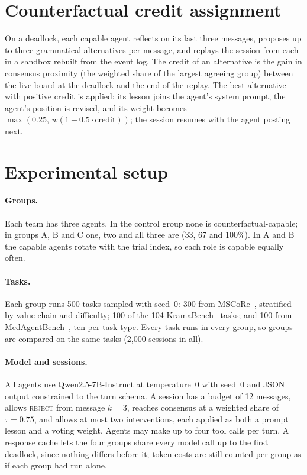 \documentclass[11pt]{article}
\begin{document}
\section{Counterfactual credit assignment}
\label{sec:cf}
On a deadlock, each capable agent reflects on its last three messages, proposes up to three
grammatical alternatives per message, and replays the session from each in a sandbox rebuilt from
the event log. The credit of an alternative is the gain in consensus proximity (the weighted
share of the largest agreeing group) between the live board at the deadlock and the end of the
replay. The best alternative with positive credit is applied: its lesson joins the agent's system
prompt, the agent's position is revised, and its weight becomes $\max(0.25,\, w(1-0.5\cdot
\mathrm{credit}))$; the session resumes with the agent posting next.

\section{Experimental setup}
\label{sec:metrics}
\paragraph{Groups.} Each team has three agents. In the control group none is
counterfactual-capable; in groups A, B and C one, two and all three are (33, 67 and 100\%). In A
and B the capable agents rotate with the trial index, so each role is capable equally often.

\paragraph{Tasks.} Each group runs 500 tasks sampled with seed~0: 300 from MSCoRe~\citep{mscore},
stratified by value chain and difficulty; 100 of the 104 KramaBench~\citep{kramabench} tasks; and
100 from MedAgentBench~\citep{medagentbench}, ten per task type. Every task runs in every group,
so groups are compared on the same tasks (2{,}000 sessions in all).

\paragraph{Model and sessions.} All agents use Qwen2.5-7B-Instruct at temperature~0 with seed~0
and JSON output constrained to the turn schema. A session has a budget of 12 messages, allows
\textsc{reject} from message $k = 3$, reaches consensus at a weighted share of $\tau = 0.75$,
and allows at most two interventions, each applied as both a prompt lesson and a voting weight.
Agents may make up to four tool calls per turn. A response cache lets the four groups share every
model call up to the first deadlock, since nothing differs before it; token costs are still
counted per group as if each group had run alone.
\end{document}
